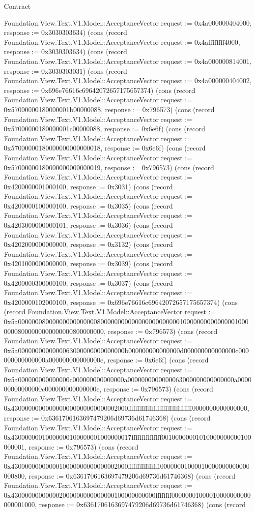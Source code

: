 \begin{lexlean}{Contract}
\begin{semanticmodule}
{Foundation.View.Text.V1.Model::AcceptanceVector {request := 0x4a000000404000, response := 0x3030303634}) (cons (record Foundation.View.Text.V1.Model::AcceptanceVector {request := 0x4affffffff4000, response := 0x3030303634}) (cons (record Foundation.View.Text.V1.Model::AcceptanceVector {request := 0x4a000000814001, response := 0x3030303031}) (cons (record Foundation.View.Text.V1.Model::AcceptanceVector {request := 0x4a000000404002, response := 0x696e76616c69642072657175657374}) (cons (record Foundation.View.Text.V1.Model::AcceptanceVector {request := 0x57000000180000001b00000088, response := 0x796573}) (cons (record Foundation.View.Text.V1.Model::AcceptanceVector {request := 0x57000000180000001c00000088, response := 0x6e6f}) (cons (record Foundation.View.Text.V1.Model::AcceptanceVector {request := 0x57000000180000000000000018, response := 0x6e6f}) (cons (record Foundation.View.Text.V1.Model::AcceptanceVector {request := 0x57000000180000000000000019, response := 0x796573}) (cons (record Foundation.View.Text.V1.Model::AcceptanceVector {request := 0x4200000001000100, response := 0x3031}) (cons (record Foundation.View.Text.V1.Model::AcceptanceVector {request := 0x4200000100000100, response := 0x3035}) (cons (record Foundation.View.Text.V1.Model::AcceptanceVector {request := 0x4203000000000101, response := 0x3036}) (cons (record Foundation.View.Text.V1.Model::AcceptanceVector {request := 0x4202000000000000, response := 0x3132}) (cons (record Foundation.View.Text.V1.Model::AcceptanceVector {request := 0x4201000000000000, response := 0x3039}) (cons (record Foundation.View.Text.V1.Model::AcceptanceVector {request := 0x4200000300000100, response := 0x3037}) (cons (record Foundation.View.Text.V1.Model::AcceptanceVector {request := 0x4200000102000100, response := 0x696e76616c69642072657175657374}) (cons (record Foundation.View.Text.V1.Model::AcceptanceVector {request := 0x5a000000080000000000000008000000000000000000000001000000000000000100000008000000000000000800000000, response := 0x796573}) (cons (record Foundation.View.Text.V1.Model::AcceptanceVector {request := 0x5a0000000000000063000000000000000b000000000000000d000000000000000c000000000000000a000000000000000e, response := 0x6e6f}) (cons (record Foundation.View.Text.V1.Model::AcceptanceVector {request := 0x5a000000000000000c000000000000000a0000000000000063000000000000000a000000000000000c000000000000000e, response := 0x796573}) (cons (record Foundation.View.Text.V1.Model::AcceptanceVector {request := 0x4300000000000000000000000000002000ffffffffffffffffffffffffffffffff0000000000000000, response := 0x6361706163697479206d69736d61746368}) (cons (record Foundation.View.Text.V1.Model::AcceptanceVector {request := 0x43000000010000000100000001000000017fffffffffffffff00100000001010000000000100000001, response := 0x796573}) (cons (record Foundation.View.Text.V1.Model::AcceptanceVector {request := 0x4300000000000010000000000000002000ffffffffffffffff00000001000010000000000000000800, response := 0x6361706163697479206d69736d61746368}) (cons (record Foundation.View.Text.V1.Model::AcceptanceVector {request := 0x430000000000002000000000000000100000000000ffffffff00000001000010000000000000001000, response := 0x6361706163697479206d69736d61746368}) (cons (record }
\end{semanticmodule}
\end{lexlean}
